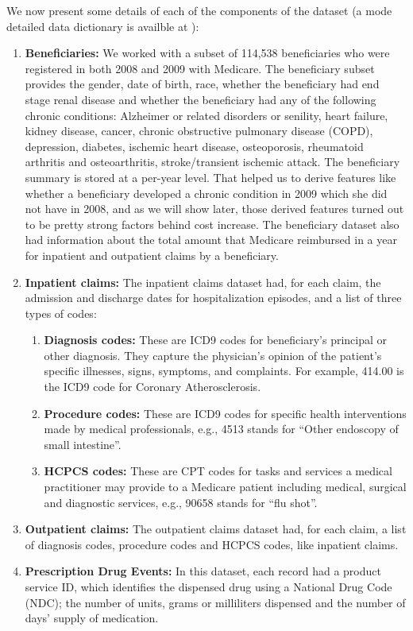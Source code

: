 We now present some details of each of the components of the dataset (a mode detailed data dictionary is availble at \cite{datadic}): 
\begin{enumerate}
\item {\bf Beneficiaries:} We worked with a subset of 114,538 beneficiaries who were registered in both 2008 and 2009 with Medicare. The beneficiary subset provides the gender, date of birth, race, whether the beneficiary had end stage renal disease and whether the beneficiary had any of the following chronic conditions: Alzheimer or related disorders or senility, heart failure, kidney disease, cancer, chronic obstructive pulmonary disease (COPD), depression, diabetes, ischemic heart disease, osteoporosis, rheumatoid arthritis and osteoarthritis, stroke/transient ischemic attack. The beneficiary summary is stored at a per-year level. That helped us to derive features like whether a beneficiary developed a chronic condition in 2009 which she did not have in 2008, and as we will show later, those derived features turned out to be pretty strong factors behind cost increase. The beneficiary dataset also had information about the total amount that Medicare reimbursed in a year for inpatient and outpatient claims by a beneficiary.  
\item {\bf Inpatient claims: }The inpatient claims dataset had, for each claim, the admission and discharge dates for hospitalization episodes, and a list of three types of codes:
\begin{enumerate}
\item {\bf Diagnosis codes: }These are ICD9 \cite{icd9} codes for beneficiary's principal or other diagnosis. They capture the physician's opinion of the patient's specific illnesses, signs, symptoms, and complaints. For example, 414.00 is the ICD9 code for Coronary Atherosclerosis.
\item {\bf Procedure codes: }These are ICD9 codes for specific health interventions made by medical professionals, e.g., 4513 stands for ``Other endoscopy of small intestine''.
\item {\bf HCPCS codes: }These are CPT codes \cite{cpt} for tasks and services a medical practitioner may provide to a Medicare patient including medical, surgical and diagnostic services, e.g., 90658 stands for ``flu shot''.
\end{enumerate}
\item {\bf Outpatient claims: }The outpatient claims dataset had, for each claim, a list of diagnosis codes, procedure codes and HCPCS codes, like inpatient claims.
\item {\bf Prescription Drug Events: }In this dataset, each record had a product service ID, which identifies the dispensed drug using a National Drug Code (NDC); the number of units, grams or milliliters dispensed and the number of days' supply of medication.
\end{enumerate}

